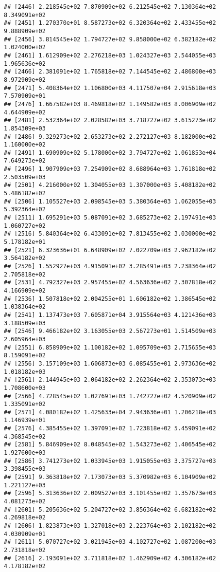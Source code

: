 \documentclass[]{article}
\begin{document}
\begin{verbatim}
## [2446] 2.218545e+02 7.870909e+02 6.212545e+02 7.130364e+02 8.349091e+02
## [2451] 1.270370e+01 8.587273e+02 6.320364e+02 2.433455e+02 9.888909e+02
## [2456] 3.814545e+02 1.794727e+02 9.858000e+02 6.382182e+02 1.024000e+02
## [2461] 1.612909e+02 2.276218e+03 1.024327e+03 2.544055e+03 1.965636e+02
## [2466] 2.381091e+02 1.765818e+02 7.144545e+02 2.486800e+03 8.972909e+02
## [2471] 5.408364e+02 1.106800e+03 4.117507e+04 2.915618e+03 7.570909e+01
## [2476] 1.667582e+03 8.469818e+02 1.149582e+03 8.006909e+02 4.644909e+02
## [2481] 2.532364e+02 2.028582e+03 3.718727e+02 3.615273e+02 1.854309e+03
## [2486] 9.329273e+02 2.653273e+02 2.272127e+03 8.182000e+02 1.160000e+02
## [2491] 1.690909e+02 5.178000e+02 3.794727e+02 1.061853e+04 7.649273e+02
## [2496] 1.907909e+03 7.254909e+02 8.688964e+03 1.761818e+02 2.503509e+03
## [2501] 4.216000e+02 1.304055e+03 1.307000e+03 5.408182e+02 5.486182e+02
## [2506] 1.105527e+03 2.098545e+03 5.380364e+03 1.062055e+03 5.392364e+02
## [2511] 1.695291e+03 5.087091e+02 3.685273e+02 2.197491e+03 1.060727e+02
## [2516] 5.840364e+02 6.433091e+02 7.813455e+02 3.030000e+02 5.178182e+01
## [2521] 6.323636e+01 6.648909e+02 7.022709e+03 2.962182e+02 3.564182e+02
## [2526] 1.552927e+03 4.915091e+02 3.285491e+03 2.238364e+02 2.705818e+02
## [2531] 4.792327e+03 2.957455e+02 4.563636e+02 2.307818e+02 4.166909e+02
## [2536] 1.507818e+02 2.004255e+01 1.606182e+02 1.386545e+02 1.038364e+02
## [2541] 1.137473e+03 7.605871e+04 3.915564e+03 4.121436e+03 3.188509e+03
## [2546] 9.466182e+02 3.163055e+03 2.567273e+01 1.514509e+03 2.605964e+03
## [2551] 6.858909e+02 1.100182e+02 1.095709e+03 2.715655e+03 8.159091e+02
## [2556] 3.157109e+03 1.606873e+03 6.085455e+01 2.973636e+02 1.018182e+03
## [2561] 2.144945e+03 2.064182e+02 2.262364e+02 2.353073e+03 1.708600e+03
## [2566] 4.728545e+02 1.027691e+03 1.742727e+02 4.520909e+02 1.335091e+02
## [2571] 4.080182e+02 1.425633e+04 2.943636e+01 1.206218e+03 1.146939e+01
## [2576] 4.385455e+02 1.397091e+02 1.723818e+02 5.459091e+02 4.368545e+02
## [2581] 5.846909e+02 8.048545e+02 1.543273e+02 1.406545e+02 1.927600e+03
## [2586] 3.741273e+02 1.033945e+03 1.915055e+03 3.375727e+03 3.398455e+03
## [2591] 9.363818e+02 7.173073e+03 5.370982e+03 6.104909e+02 1.221127e+03
## [2596] 5.313636e+02 2.009527e+03 3.101455e+02 1.357673e+03 4.081273e+02
## [2601] 5.205636e+02 5.204727e+02 3.856364e+02 6.682182e+02 4.269818e+02
## [2606] 1.823873e+03 1.327018e+03 2.223764e+03 2.102182e+02 4.030909e+01
## [2611] 5.070727e+02 3.021945e+03 4.102727e+02 1.087200e+03 2.731818e+02
## [2616] 2.193091e+02 3.711818e+02 1.462909e+02 4.306182e+02 4.178182e+02

\end{verbatim}
\end{document}
